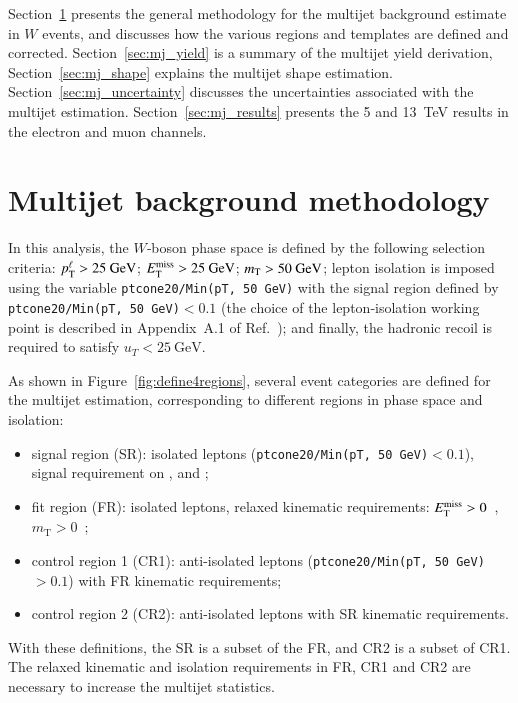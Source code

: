 Section~\ref{sec:mj_method} presents the general methodology for the multijet background estimate in $W$ events, and discusses how the various regions and templates are defined and corrected.
Section~\ref{sec:mj_yield} is a summary of the multijet yield derivation, Section~\ref{sec:mj_shape} explains the multijet shape estimation.
Section~\ref{sec:mj_uncertainty} discusses the uncertainties associated with the multijet estimation.
Section~\ref{sec:mj_results} presents the 5 and 13~TeV results in the electron and muon channels. 


\section{Multijet background methodology}
\label{sec:mj_method}


In this analysis, the $W$‑boson phase space is defined by the following selection criteria: $p_{\text{T}}^{\ell}  > 25~\text{GeV}$; $E_{\text{T}}^{\text{miss}} > 25~\text{GeV}$;  $m_\mathrm{T}  > 50~\text{GeV}$; lepton isolation is imposed using the variable \texttt{ptcone20/Min(pT, 50~GeV)} with the signal region defined by \texttt{ptcone20/Min(pT, 50~GeV)}$ < 0.1$ (the choice of the lepton‑isolation working point is described in Appendix~A.1 of Ref.~\cite{Xu:2657146}); and finally, the hadronic recoil is required to satisfy $u_T < 25~\text{GeV}$.

As shown in Figure~\ref{fig:define4regions}, several event categories are defined for the multijet estimation, corresponding to different regions in phase space and isolation:
%
\begin{itemize}
    \item signal region (SR): isolated leptons (\texttt{ptcone20/Min(pT,~50~GeV)}$<0.1$), signal requirement on \ptl, \met and \mt;
    \item fit region (FR): isolated leptons, relaxed kinematic requirements: $E_{\text{T}}^{\text{miss}}>0$~\gev, $m_\text{T}>0$~\gev;
    \item control region 1 (CR1): anti-isolated leptons (\texttt{ptcone20/Min(pT,~50~GeV)}$>0.1$) with FR kinematic requirements;
    \item control region 2 (CR2): anti-isolated leptons with SR kinematic requirements.
\end{itemize}
%
With these definitions, the SR is a subset of the FR, and CR2 is a subset of CR1.
The relaxed kinematic and isolation requirements in FR, CR1 and CR2 are necessary to increase the multijet statistics.

